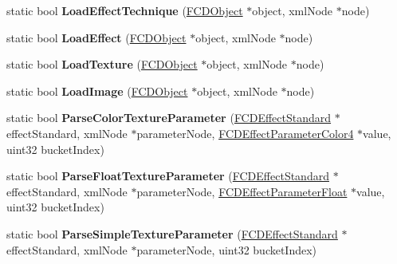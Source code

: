 \begin{DoxyCompactItemize}
\item 
\hypertarget{classFArchiveXML_ab02955007a3e0a50373cd03e44ad1eb2}{
static bool {\bfseries LoadEffectTechnique} (\hyperlink{classFCDObject}{FCDObject} $\ast$object, xmlNode $\ast$node)}
\label{classFArchiveXML_ab02955007a3e0a50373cd03e44ad1eb2}

\item 
\hypertarget{classFArchiveXML_a3a1872c89840e3b0af2f45fc1375e672}{
static bool {\bfseries LoadEffect} (\hyperlink{classFCDObject}{FCDObject} $\ast$object, xmlNode $\ast$node)}
\label{classFArchiveXML_a3a1872c89840e3b0af2f45fc1375e672}

\item 
\hypertarget{classFArchiveXML_a3292f8a8a3dca9046bec1a417cd13d14}{
static bool {\bfseries LoadTexture} (\hyperlink{classFCDObject}{FCDObject} $\ast$object, xmlNode $\ast$node)}
\label{classFArchiveXML_a3292f8a8a3dca9046bec1a417cd13d14}

\item 
\hypertarget{classFArchiveXML_ac40abf7d8f99b67eafea35aef962870c}{
static bool {\bfseries LoadImage} (\hyperlink{classFCDObject}{FCDObject} $\ast$object, xmlNode $\ast$node)}
\label{classFArchiveXML_ac40abf7d8f99b67eafea35aef962870c}

\item 
\hypertarget{classFArchiveXML_ac4e5157296983ebccf95db178d1ce8c0}{
static bool {\bfseries ParseColorTextureParameter} (\hyperlink{classFCDEffectStandard}{FCDEffectStandard} $\ast$effectStandard, xmlNode $\ast$parameterNode, \hyperlink{classFCDEffectParameterAnimatableT}{FCDEffectParameterColor4} $\ast$value, uint32 bucketIndex)}
\label{classFArchiveXML_ac4e5157296983ebccf95db178d1ce8c0}

\item 
\hypertarget{classFArchiveXML_a3564c020122c1c0dc5b42cb0d29bac74}{
static bool {\bfseries ParseFloatTextureParameter} (\hyperlink{classFCDEffectStandard}{FCDEffectStandard} $\ast$effectStandard, xmlNode $\ast$parameterNode, \hyperlink{classFCDEffectParameterAnimatableT}{FCDEffectParameterFloat} $\ast$value, uint32 bucketIndex)}
\label{classFArchiveXML_a3564c020122c1c0dc5b42cb0d29bac74}

\item 
\hypertarget{classFArchiveXML_a8bb8080121201b7b720577379407ee7b}{
static bool {\bfseries ParseSimpleTextureParameter} (\hyperlink{classFCDEffectStandard}{FCDEffectStandard} $\ast$effectStandard, xmlNode $\ast$parameterNode, uint32 bucketIndex)}
\label{classFArchiveXML_a8bb8080121201b7b720577379407ee7b}


\end{DoxyCompactItemize}
